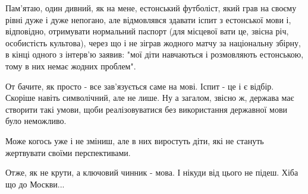 Пам'ятаю, один дивний, як на мене, естонський футболіст, який грав на своєму
рівні дуже і дуже непогано, але відмовлявся здавати іспит з естонської мови і,
відповідно, отримувати нормальний паспорт (для місцевої вати це, звісна річ,
особистість культова), через що і не зіграв жодного матчу за національну
збірну, в кінці одного з інтерв'ю заявив: "мої діти навчаються і розмовляють
естонською, тому в них немає жодних проблем".

От бачите, як просто - все зав'язується саме на мові. Іспит - це і є відбір.
Скоріше навіть символічний, але не лише. Ну а загалом, звісно ж, держава має
створити такі умови, щоби реалізовуватися без використання державної мови було
неможливо. 

Може когось уже і не зміниш, але в них виростуть діти, які не стануть
жертвувати своїми перспективами. 

Отже, як не крути, а ключовий чинник - мова. І нікуди від цього не підеш. Хіба
що до Москви...

